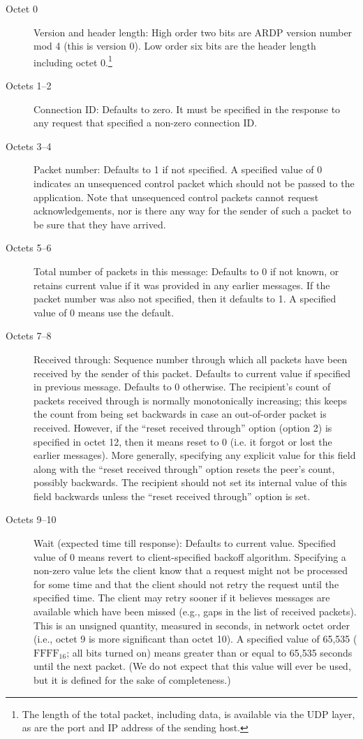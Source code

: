 \begin{description}
\item[Octet 0] Version and header length: High order two bits are ARDP
version number mod 4 (this is version 0). Low order six bits are the
header length including octet 0.\footnote{The length of the total
packet, including data, is available via the UDP layer, as are the
port and IP address of the sending host.}

\item[Octets 1--2] Connection ID: Defaults to zero.  It must be
specified in the response to any request that specified a non-zero
connection ID.

\item[Octets 3--4] Packet number: Defaults to 1 if not specified. A specified
value of 0 indicates an unsequenced control packet which should not
be passed to the application.   Note that unsequenced control packets
cannot request acknowledgements, nor is there any way for the sender
of such a packet to be sure that they have arrived.

\item[Octets 5--6] Total number of packets in this message:   Defaults
to 0 if not known, or retains current value if it was provided in any
earlier messages.  If the packet number was also not specified, then
it defaults to 1.  A specified value of 0 means use the default.

\item[Octets 7--8] Received through:   Sequence number through which
all packets have been received by the sender of this packet.  Defaults
to current value if specified in previous message. Defaults to 0
otherwise.  The recipient's count of packets received through is
normally monotonically increasing; this keeps the count from being set
backwards in case an out-of-order packet is received.  However, if the
``reset received through'' option (option 2) is specified in octet 12, then it
means reset to 0 (i.e. it forgot or lost the earlier messages).  More
generally, specifying any explicit value for this field along with the
``reset received through'' option resets the peer's count, possibly
backwards.  The recipient should not set its internal value of this
field backwards unless the ``reset received through'' option is set.

\item[Octets 9--10] Wait (expected time till response): Defaults to
current value. Specified value of 0 means revert to client-specified
backoff algorithm.  Specifying a non-zero value lets the
client know that a request might not be processed for some time and
that the client should not retry the request until the specified time.
The client may retry sooner if it believes
messages are available which have been missed (e.g., gaps in the list
of received packets).  This is an unsigned
quantity, measured in seconds, in network octet order (i.e., octet 9 is
more significant than octet 10).  A specified value of 65,535
(\(\mbox{FFFF}_{16}\); 
all bits turned on) means greater than or equal to 65,535 seconds
until the next packet.  (We do not expect that this value will ever be
used, but it is defined for the sake of completeness.)   


\end{description}

